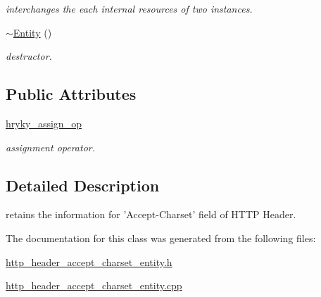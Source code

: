 \begin{DoxyCompactItemize}
\begin{DoxyCompactList}\small\item\em interchanges the each internal resources of two instances. \end{DoxyCompactList}\item 
\hypertarget{classhryky_1_1http_1_1header_1_1accept_1_1charset_1_1_entity_a10208de87d67b033d1de9bd79401d6fa}{\hyperlink{classhryky_1_1http_1_1header_1_1accept_1_1charset_1_1_entity_a10208de87d67b033d1de9bd79401d6fa}{$\sim$\-Entity} ()}\label{classhryky_1_1http_1_1header_1_1accept_1_1charset_1_1_entity_a10208de87d67b033d1de9bd79401d6fa}

\begin{DoxyCompactList}\small\item\em destructor. \end{DoxyCompactList}\end{DoxyCompactItemize}
\subsection*{Public Attributes}
\begin{DoxyCompactItemize}
\item 
\hypertarget{classhryky_1_1http_1_1header_1_1accept_1_1charset_1_1_entity_a1bc27d9de207aeab9aa5183beebae84a}{\hyperlink{classhryky_1_1http_1_1header_1_1accept_1_1charset_1_1_entity_a1bc27d9de207aeab9aa5183beebae84a}{hryky\-\_\-assign\-\_\-op}}\label{classhryky_1_1http_1_1header_1_1accept_1_1charset_1_1_entity_a1bc27d9de207aeab9aa5183beebae84a}

\begin{DoxyCompactList}\small\item\em assignment operator. \end{DoxyCompactList}\end{DoxyCompactItemize}


\subsection{Detailed Description}
retains the information for 'Accept-\/\-Charset' field of H\-T\-T\-P Header. 

The documentation for this class was generated from the following files\-:\begin{DoxyCompactItemize}
\item 
\hyperlink{http__header__accept__charset__entity_8h}{http\-\_\-header\-\_\-accept\-\_\-charset\-\_\-entity.\-h}\item 
\hyperlink{http__header__accept__charset__entity_8cpp}{http\-\_\-header\-\_\-accept\-\_\-charset\-\_\-entity.\-cpp}\end{DoxyCompactItemize}
